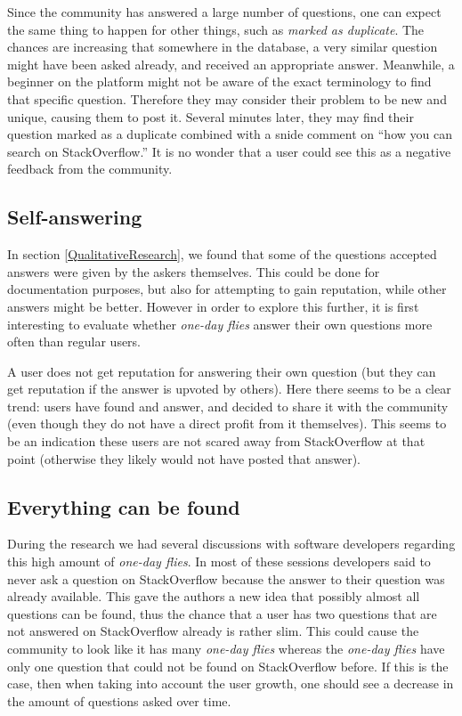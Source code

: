 \documentclass[conference]{IEEEtran}
\newcommand\odf{\emph{one-day flies}\xspace}
\newcommand\ru{regular users\xspace}
\begin{document}
Since the community has answered a large number of questions, one can expect
the same thing to happen for other things, such as \textit{marked as
duplicate}. The chances are increasing that somewhere in the database, a very
similar question might have been asked already, and received an appropriate
answer. Meanwhile, a beginner on the platform might not be aware of the exact
terminology to find that specific question. Therefore they may consider their
problem to be new and unique, causing them to post it. Several minutes later,
they may find their question marked as a duplicate combined with a snide
comment on ``how you can search on StackOverflow.'' It is no wonder that a user
could see this as a negative feedback from the community.


\subsection{Self-answering}
In section \ref{QualitativeResearch}, we found that some of the
questions accepted answers were given by the askers themselves. This
could be done for documentation purposes, but also for attempting to gain
reputation, while other answers might be better. However in order to explore
this further, it is first interesting to evaluate whether \odf answer their 
own questions more often than \ru.

A user does not get reputation for answering their own question (but they can
get reputation if the answer is upvoted by others). Here there seems to be a
clear trend: users have found and answer, and decided to share it with the
community (even though they do not have a direct profit from it themselves).
This seems to be an indication these users are not scared away from
StackOverflow at that point (otherwise they likely would not have posted that
answer). 

\subsection{Everything can be found}
During the research we had several discussions with software developers
regarding this high amount of \odf. In most of these sessions
developers said to never ask a question on StackOverflow because the answer to
their question was already available. This gave the authors a new idea that
possibly almost all questions can be found, thus the chance that a user has two
questions that are not answered on StackOverflow already is rather slim. This
could cause the community to look like it has many \odf whereas the
\odf have only one question that could not be found on StackOverflow
before. If this is the case, then when taking into account the user growth, one
should see a decrease in the amount of questions asked over time. 
\end{document}
